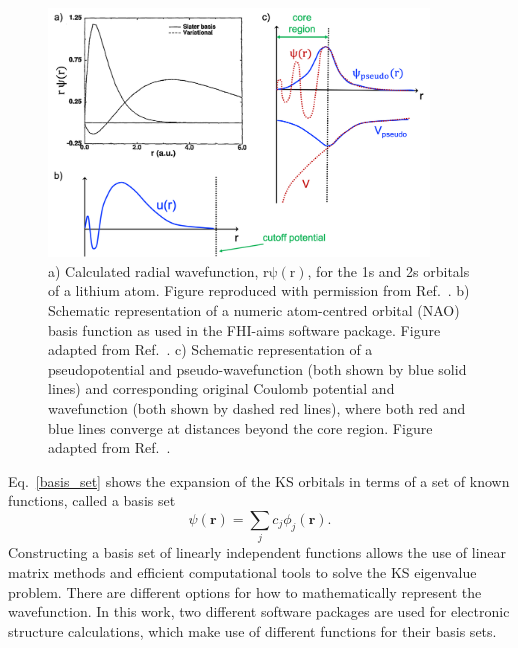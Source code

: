 \documentclass[11pt, twoside]{report}
\begin{document}
\begin{figure}[h!]
  \centering
    \includegraphics[width=0.9\textwidth]{figures/wavefunction_construction.png}
    \caption[a) Calculated radial wavefunction, $\mathrm{r\psi(r)}$, for the 1s and 2s orbitals of a lithium atom. b) Schematic representation of a numeric atom-centred orbital (NAO) basis function as used in the FHI-aims software package. c) Schematic representation of a pseudopotential and pseudo-wavefunction (both shown by blue solid lines) and corresponding original Coulomb potential and wavefunction (both shown by dashed red lines), where both red and blue lines converge at distances beyond the core region.]
     {a) Calculated radial wavefunction, $\mathrm{r\psi(r)}$, for the 1s and 2s orbitals of a lithium atom. Figure reproduced with permission from Ref.~. b) Schematic representation of a numeric atom-centred orbital (NAO) basis function as used in the FHI-aims software package. Figure adapted from Ref.~. c) Schematic representation of a pseudopotential and pseudo-wavefunction (both shown by blue solid lines) and corresponding original Coulomb potential and wavefunction (both shown by dashed red lines), where both red and blue lines converge at distances beyond the core region. Figure adapted from Ref.~.}
  \label{wavefunction_construction}
\end{figure}

Eq.~\ref{basis_set} shows the expansion of the KS orbitals in terms of a set of known functions, called a basis set 
\begin{equation}\label{basis_set}
\psi(\boldsymbol{r}) = \sum_j c_j \phi_j(\boldsymbol{r}) .
\end{equation}
Constructing a basis set of linearly independent functions allows the use of linear matrix methods and efficient computational tools to solve the KS eigenvalue problem. There are different options for how to mathematically represent the wavefunction. In this work, two different software packages are used for electronic structure calculations, which make use of different functions for their basis sets. 
\end{document}
